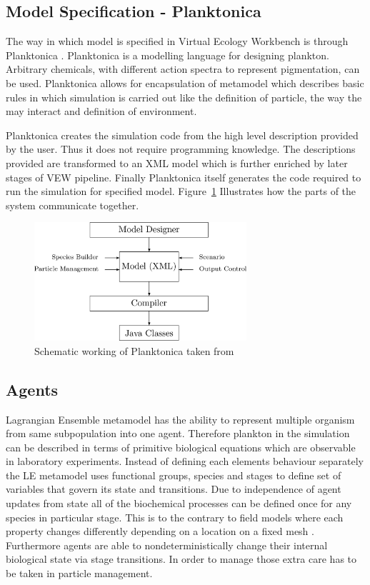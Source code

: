 \documentclass[12pt, a4paper]{report}
\begin{document}
\subsection{Model Specification - Planktonica}\label{subsec:planktonica}
The way in which model is specified in Virtual Ecology Workbench is through
Planktonica \cite{Planktonica}. Planktonica is a modelling language for
designing plankton. Arbitrary chemicals, with different action spectra to
represent pigmentation, can be used. Planktonica allows for encapsulation of
metamodel which describes basic rules in which simulation is carried out
like the definition of particle, the way the may interact and definition
of environment.

Planktonica creates the simulation code from the high level description
provided by the user. Thus it does not require programming knowledge.
The descriptions provided are transformed to an XML model which is
further enriched by later stages of VEW pipeline. Finally Planktonica
itself generates the code required to run the simulation for specified
model. Figure~\ref{fig:planktonica} Illustrates how the parts of the system
communicate together.

\begin{figure}[H]
  \centering
  \includegraphics[width=0.7\textwidth,natwidth=1080,natheight=604]{images/planktonica.jpg}
  \caption{Schematic working of Planktonica taken from \cite{Planktonica}}
  \label{fig:planktonica}
\end{figure}

\subsection{Agents}\label{subsec:agents}
Lagrangian Ensemble metamodel has the ability to represent
multiple organism from same subpopulation into one agent.
Therefore plankton in the simulation can be described in
terms of primitive biological equations which are
observable in laboratory experiments. Instead of defining
each elements behaviour separately the LE metamodel uses
functional groups, species and stages to define set of
variables that govern its state and transitions.
Due to independence of agent updates from state all of the
biochemical processes can be defined once for any species
in particular stage. This is to the contrary to field models
where each property changes differently depending on a location
on a fixed mesh \cite{Woods200543}. Furthermore agents are able to
nondeterministically change their internal biological
state via stage transitions. In order to manage
those extra care has to be taken in particle management.
\end{document}
